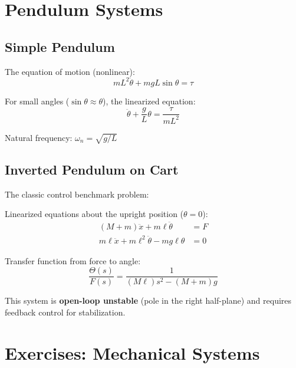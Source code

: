 \section{Pendulum Systems}
\label{sec:pendulum}

\subsection{Simple Pendulum}



The equation of motion (nonlinear):
\begin{equation}
mL^2\ddot{\theta} + mgL\sin\theta = \tau
\end{equation}

For small angles ($\sin\theta \approx \theta$), the linearized equation:
\begin{equation}
\ddot{\theta} + \frac{g}{L}\theta = \frac{\tau}{mL^2}
\end{equation}

Natural frequency: $\omega_n = \sqrt{g/L}$

\subsection{Inverted Pendulum on Cart}

The classic control benchmark problem:



Linearized equations about the upright position ($\theta = 0$):
\begin{align}
(M + m)\ddot{x} + m\ell\ddot{\theta} &= F \\
m\ell\ddot{x} + m\ell^2\ddot{\theta} - mg\ell\theta &= 0
\end{align}

Transfer function from force to angle:
\begin{equation}
\frac{\Theta(s)}{F(s)} = \frac{1}{(M\ell)s^2 - (M+m)g}
\end{equation}

This system is \textbf{open-loop unstable} (pole in the right half-plane) and requires feedback control for stabilization.

\section{Exercises: Mechanical Systems}

